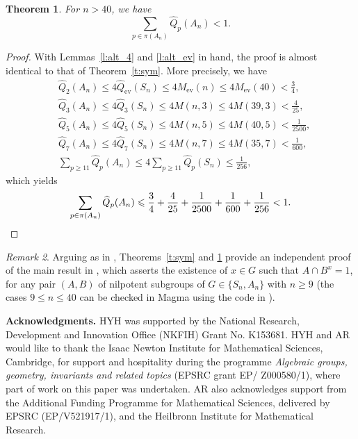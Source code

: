 \documentclass[11pt]{amsart}
\numberwithin{equation}{section}
\newtheorem{theorem}{Theorem}[section]
\theoremstyle{definition}
\theoremstyle{remark}
\newtheorem{remark}[theorem]{Remark}
\begin{document}
\begin{theorem}\label{t:alt}
    For $n > 40$, we have
    \begin{equation*}
        \sum_{p \in \pi (A_n)} \widehat{Q}_p(A_n) < 1.
    \end{equation*}
\end{theorem}

\begin{proof}
    With Lemmas~\ref{l:alt_4} and \ref{l:alt_ev} in hand,
    the proof is almost identical to that of Theorem~\ref{t:sym}.
    More precisely, we have
    \begin{equation*}
        \begin{aligned}
            &\widehat{Q}_2(A_n) \leqslant 4\widehat{Q}_{\mathrm{ev}}(S_n) \leqslant 4M_{\mathrm{ev}}(n) \leqslant 4M_{\mathrm{ev}}(40) < \frac{3}{4} , \\
            &\widehat{Q}_3(A_n) \leqslant 4\widehat{Q}_3(S_n) \leqslant 4M(n,3) \leqslant 4M(39,3) < \frac{4}{25} , \\
            &\widehat{Q}_5(A_n) \leqslant 4\widehat{Q}_5(S_n) \leqslant 4M(n,5) \leqslant 4M(40,5) < \frac{1}{2500} , \\
            &\widehat{Q}_7(A_n) \leqslant 4\widehat{Q}_7(S_n) \leqslant 4M(n,7) \leqslant 4M(35,7) < \frac{1}{600} ,\\
            &\sum_{p\geqslant 11}\widehat{Q}_p(A_n) \leqslant 4\sum_{p\geqslant 11}\widehat{Q}_p(S_n) \leqslant \frac{1}{256},
        \end{aligned}
    \end{equation*}
    which yields
    \begin{equation*}
        \sum_{p\in\pi(A_n)} \widehat{Q}_p(A_n) \leqslant \frac{3}{4} + \frac{4}{25} + \frac{1}{2500} +\frac{1}{600} + \frac{1}{256} < 1. \qedhere
    \end{equation*}
\end{proof}

\begin{remark}
Arguing as in \cite[Theorem~F]{BH26},
Theorems~\ref{t:sym} and \ref{t:alt} provide an independent proof of the main result in \cite{Zen14},
which asserts the existence of $x \in G$ such that $A \cap B^x = 1$,
for any pair $(A,B)$ of nilpotent subgroups of $G\in\{S_n,A_n\}$ with $n \geqslant 9$
(the cases $9 \leqslant n \leqslant 40$ can be checked in {\sc Magma} using the code in \cite{HLRS26}).
\end{remark}

\vspace{0.2cm} \noindent
 {\bfseries Acknowledgments.}
HYH was supported by the National Research, Development and Innovation Office (NKFIH) Grant No. K153681. HYH and AR would like to thank the Isaac Newton Institute for Mathematical Sciences, Cambridge, for support and hospitality during the programme \textit{Algebraic groups, geometry, invariants and related topics} (EPSRC grant EP/
Z000580/1), where part of work on this paper was undertaken. AR also acknowledges support from the Additional Funding Programme for Mathematical Sciences, delivered by EPSRC (EP/V521917/1), and the Heilbronn Institute for Mathematical Research.
\end{document}
